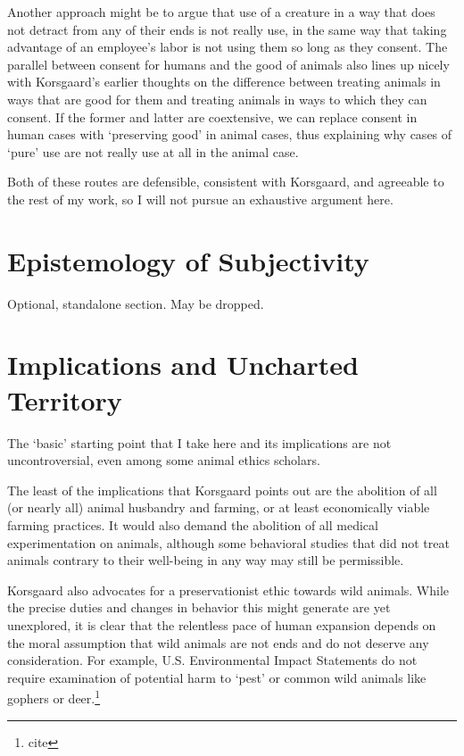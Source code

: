 		Another approach might be to argue that use of a creature in a way that
		does not detract from any of their ends is not really use, in the same
		way that taking advantage of an employee’s labor is not using them so
		long as they consent. The parallel between consent for humans and the
		good of animals also lines up nicely with Korsgaard’s earlier thoughts
		on the difference between treating animals in ways that are good for
		them and treating animals in ways to which they can consent.
		If the former and latter are coextensive, we can replace consent in
		human cases with ‘preserving good’ in animal cases, thus explaining why
		cases of ‘pure’ use are not really use at all in the animal case.

		Both of these routes are defensible, consistent with Korsgaard, and
		agreeable to the rest of my work, so I will not pursue an exhaustive
		argument here.

	\section{Epistemology of Subjectivity}
		Optional, standalone section. May be dropped.

	\section{Implications and Uncharted Territory}
		The ‘basic’ starting point that I take here and its implications are
		not uncontroversial, even among some animal ethics scholars.

		The least of the implications that Korsgaard points out are the
		abolition of all (or nearly all) animal husbandry and farming, or at
		least economically viable farming practices. It would also demand the
		abolition of all medical experimentation on animals, although some
		behavioral studies that did not treat animals contrary to their
		well-being in any way may still be permissible.

		Korsgaard also advocates for a preservationist ethic towards wild
		animals. While the precise duties and changes in behavior this might
		generate are yet unexplored, it is clear that the relentless pace of
		human expansion depends on the moral assumption that wild animals are
		not ends and do not deserve any consideration. For example, U.S.
		Environmental Impact Statements do not require examination of potential
		harm to ‘pest’ or common wild animals like gophers or
		deer.\footnote{cite}

